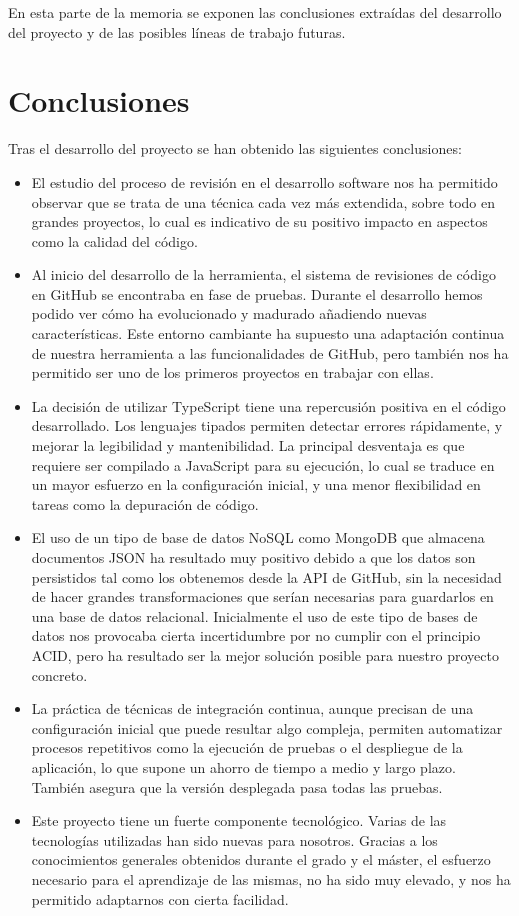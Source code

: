 
En esta parte de la memoria se exponen las conclusiones extraídas del desarrollo del proyecto y de las posibles líneas de trabajo futuras.

\section{Conclusiones}

Tras el desarrollo del proyecto se han obtenido las siguientes conclusiones:

\begin{itemize}
	\item El estudio del proceso de revisión en el desarrollo software nos ha permitido observar que se trata de una técnica cada vez más extendida, sobre todo en grandes proyectos, lo cual es indicativo de su positivo impacto en aspectos como la calidad del código.
	\item Al inicio del desarrollo de la herramienta, el sistema de revisiones de código en GitHub se encontraba en fase de pruebas. Durante el desarrollo hemos podido ver cómo ha evolucionado y madurado añadiendo nuevas características. Este entorno cambiante ha supuesto una adaptación continua de nuestra herramienta a las funcionalidades de GitHub, pero también nos ha permitido ser uno de los primeros proyectos en trabajar con ellas.
	\item La decisión de utilizar TypeScript tiene una repercusión positiva en el código desarrollado. Los lenguajes tipados permiten detectar errores rápidamente, y mejorar la legibilidad y mantenibilidad. La principal desventaja es que requiere ser compilado a JavaScript para su ejecución, lo cual se traduce en un mayor esfuerzo en la configuración inicial, y una menor flexibilidad en tareas como la depuración de código.
	\item El uso de un tipo de base de datos NoSQL como MongoDB que almacena documentos JSON ha resultado muy positivo debido a que los datos son persistidos tal como los obtenemos desde la API de GitHub, sin la necesidad de hacer grandes transformaciones que serían necesarias para guardarlos en una base de datos relacional. Inicialmente el uso de este tipo de bases de datos nos provocaba cierta incertidumbre por no cumplir con el principio ACID, pero ha resultado ser la mejor solución posible para nuestro proyecto concreto.
	\item La práctica de técnicas de integración continua, aunque precisan de una configuración inicial que puede resultar algo compleja, permiten automatizar procesos repetitivos como la ejecución de pruebas o el despliegue de la aplicación, lo que supone un ahorro de tiempo a medio y largo plazo. También asegura que la versión desplegada pasa todas las pruebas.
	\item Este proyecto tiene un fuerte componente tecnológico. Varias de las tecnologías utilizadas han sido nuevas para nosotros. Gracias a los conocimientos generales obtenidos durante el grado y el máster, el esfuerzo necesario para el aprendizaje de las mismas, no ha sido muy elevado, y nos ha permitido adaptarnos con cierta facilidad.
\end{itemize}

